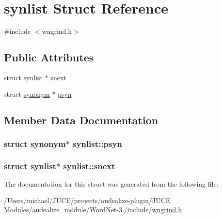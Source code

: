 \hypertarget{structsynlist}{}\section{synlist Struct Reference}
\label{structsynlist}


{\ttfamily \#include $<$wngrind.\+h$>$}

\subsection*{Public Attributes}
\begin{DoxyCompactItemize}
\item 
struct \hyperlink{structsynlist}{synlist} $\ast$ \hyperlink{structsynlist_aa876afb1c31ffb1d4110cf1ea7fdd9fc}{snext}
\item 
struct \hyperlink{structsynonym}{synonym} $\ast$ \hyperlink{structsynlist_a8d1e2127237274f07903ffa05710f201}{psyn}
\end{DoxyCompactItemize}


\subsection{Member Data Documentation}
\subsubsection[{\texorpdfstring{psyn}{psyn}}]{\setlength{\rightskip}{0pt plus 5cm}struct {\bf synonym}$\ast$ synlist\+::psyn}\hypertarget{structsynlist_a8d1e2127237274f07903ffa05710f201}{}\label{structsynlist_a8d1e2127237274f07903ffa05710f201}
\subsubsection[{\texorpdfstring{snext}{snext}}]{\setlength{\rightskip}{0pt plus 5cm}struct {\bf synlist}$\ast$ synlist\+::snext}\hypertarget{structsynlist_aa876afb1c31ffb1d4110cf1ea7fdd9fc}{}\label{structsynlist_aa876afb1c31ffb1d4110cf1ea7fdd9fc}


The documentation for this struct was generated from the following file\+:\begin{DoxyCompactItemize}
\item 
/\+Users/michael/\+J\+U\+C\+E/projects/audealize-\/plugin/\+J\+U\+C\+E Modules/audealize\+\_\+module/\+Word\+Net-\/3./include/\hyperlink{wngrind_8h}{wngrind.\+h}\end{DoxyCompactItemize}
